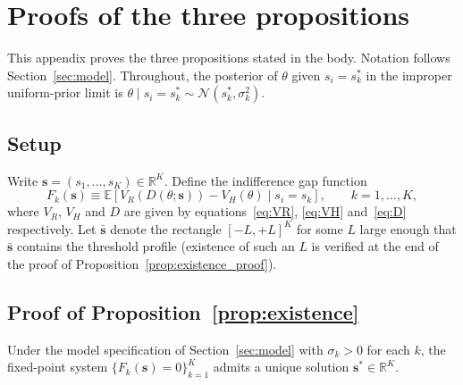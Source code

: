 \section{Proofs of the three propositions}\label{sec:proofs}

This appendix proves the three propositions stated in the body. Notation follows Section~\ref{sec:model}. Throughout, the posterior of $\theta$ given $s_i = s^*_k$ in the improper uniform-prior limit is $\theta \mid s_i = s^*_k \sim \mathcal{N}(s^*_k, \sigma_k^2)$.

\subsection*{Setup}

Write $\boldsymbol{s} = (s_1, \dots, s_K) \in \mathbb{R}^K$. Define the indifference gap function
\begin{equation}\label{eq:Fk}
F_k(\boldsymbol{s}) \equiv \mathbb{E}\!\left[V_R(D(\theta; \boldsymbol{s})) - V_H(\theta) \mid s_i = s_k\right], \qquad k = 1, \dots, K,
\end{equation}
where $V_R$, $V_H$ and $D$ are given by equations~\eqref{eq:VR}, \eqref{eq:VH} and~\eqref{eq:D} respectively. Let $\bar{\boldsymbol{s}}$ denote the rectangle $[-L, +L]^K$ for some $L$ large enough that $\bar{\boldsymbol{s}}$ contains the threshold profile (existence of such an $L$ is verified at the end of the proof of Proposition~\ref{prop:existence_proof}).

\subsection*{Proof of Proposition~\ref{prop:existence}}\label{sub:proof_p1}

\begin{proposition}\label{prop:existence_proof}
Under the model specification of Section~\ref{sec:model} with $\sigma_k > 0$ for each $k$, the fixed-point system $\{F_k(\boldsymbol{s}) = 0\}_{k=1}^K$ admits a unique solution $\boldsymbol{s}^* \in \mathbb{R}^K$.
\end{proposition}

